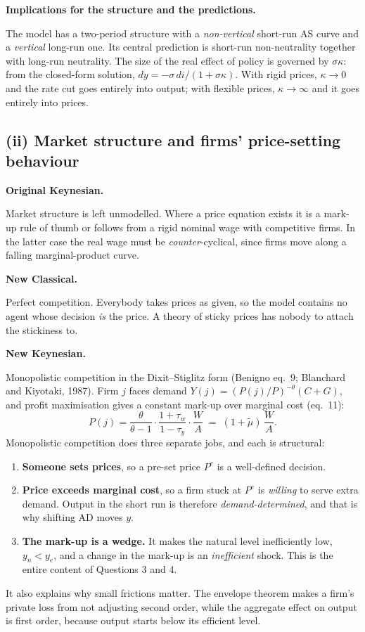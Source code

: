 \documentclass[11pt, a4paper]{article}
\newcommand{\passo}[1]{\medskip\noindent\textbf{#1}\par\nobreak}
\begin{document}
\passo{Implications for the structure and the predictions.}
The model has a two-period structure with a \emph{non-vertical} short-run AS curve and a
\emph{vertical} long-run one. Its central prediction is short-run non-neutrality together
with long-run neutrality. The size of the real effect of policy is governed by
$\sigma\kappa$: from the closed-form solution,
$dy=-\sigma\,di/(1+\sigma\kappa)$. With rigid prices, $\kappa\to0$ and the rate cut goes
entirely into output; with flexible prices, $\kappa\to\infty$ and it goes entirely into
prices.

\subsection*{(ii) Market structure and firms' price-setting behaviour}

\passo{Original Keynesian.}
Market structure is left unmodelled. Where a price equation exists it is a mark-up rule of
thumb or follows from a rigid nominal wage with competitive firms. In the latter case the
real wage must be \emph{counter}-cyclical, since firms move along a falling marginal-product
curve.

\passo{New Classical.}
Perfect competition. Everybody takes prices as given, so the model contains no agent whose
decision \emph{is} the price. A theory of sticky prices has nobody to attach the stickiness
to.

\passo{New Keynesian.}
Monopolistic competition in the Dixit--Stiglitz form (Benigno eq.\ 9; Blanchard and
Kiyotaki, 1987). Firm $j$ faces demand $Y(j)=(P(j)/P)^{-\theta}(C+G)$, and profit
maximisation gives a constant mark-up over marginal cost (eq.\ 11):
\[
P(j)=\frac{\theta}{\theta-1}\cdot\frac{1+\tau_w}{1-\tau_y}\cdot\frac{W}{A}
\;=\;(1+\tilde\mu)\,\frac{W}{A}.
\]
Monopolistic competition does three separate jobs, and each is structural:
\begin{enumerate}[label=\arabic*.]
\item \textbf{Someone sets prices}, so a pre-set price $P^e$ is a well-defined decision.
\item \textbf{Price exceeds marginal cost}, so a firm stuck at $P^e$ is \emph{willing} to
      serve extra demand. Output in the short run is therefore \emph{demand-determined}, and
      that is why shifting AD moves $y$.
\item \textbf{The mark-up is a wedge.} It makes the natural level inefficiently low,
      $y_n<y_e$, and a change in the mark-up is an \emph{inefficient} shock. This is the
      entire content of Questions 3 and 4.
\end{enumerate}
It also explains why small frictions matter. The envelope theorem makes a firm's private
loss from not adjusting second order, while the aggregate effect on output is first order,
because output starts below its efficient level.
\end{document}
